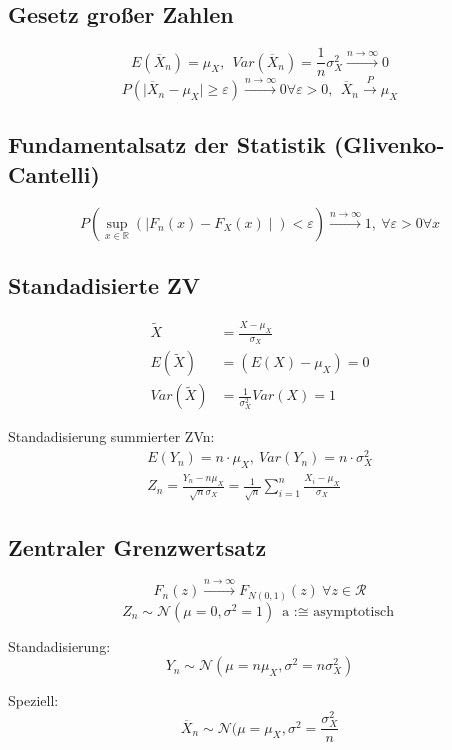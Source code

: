 \documentclass[10pt,a4paper,landscape]{article}
\begin{document}
\begin{multicols}{4}
\subsection{Gesetz großer Zahlen}
\[
E(\overline{X}_n) = \mu_X ,~~ Var(\overline{X}_n)= \frac{1}{n} \sigma_X^2 \xrightarrow{n \to \infty} 0
\]
\[
P(\mid \overline{X}_n - \mu_X \mid \geq \varepsilon) \xrightarrow{n \to \infty} 0 \forall \varepsilon > 0, ~~ \overline{X}_n \xrightarrow{P} \mu_X
\]

\subsection{Fundamentalsatz der Statistik (Glivenko-Cantelli)}
\[
P\left(\sup_{x \in \mathbb{R}}(\mid F_n(x) - F_X(x) \mid ) < \varepsilon\right) \xrightarrow{n \to \infty} 1, ~ \forall \varepsilon > 0 \forall x
\]

\subsection{Standadisierte ZV}
\begin{align*}
\tilde{X} &= \frac{X- \mu_X}{\sigma_X} \\
E(\tilde{X}) &= (E(X)-\mu_X)=0 \\
Var(\tilde{X})&=\frac{1}{\sigma^2_X}Var(X) = 1
\end{align*}

Standadisierung summierter ZVn:
\begin{align*}
E(Y_n) = n \cdot \mu_X, ~ Var(Y_n)= n \cdot \sigma_X^2 \\
Z_n = \frac{Y_n - n\mu_X}{\sqrt{n}\sigma_X}=\frac{1}{\sqrt{n}}\sum_{i=1}^n \frac{X_i-\mu_X}{\sigma_X}
\end{align*}

\subsection{Zentraler Grenzwertsatz}
\[
F_n(z) \xrightarrow{n \to \infty} F_{N(0,1)}(z) ~ \forall z \in \mathcal{R}
\]
\[
Z_n \sim \mathcal{N}(\mu = 0, \sigma^2 = 1) ~ \text{a :$\cong$ asymptotisch}
\]

Standadisierung:
\[
Y_n \sim \mathcal{N}(\mu = n\mu_X, \sigma^2= n \sigma_X^2)
\]

Speziell:
\[
\overline{X}_n \sim \mathcal{N}(\mu = \mu_X, \sigma^2=\frac{\sigma_X^2}{n}
\]



\end{multicols}
\end{document}
